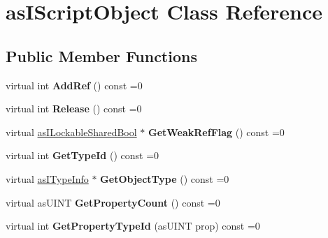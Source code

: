 \hypertarget{classas_i_script_object}{}\section{as\+I\+Script\+Object Class Reference}
\label{classas_i_script_object}
\subsection*{Public Member Functions}
\begin{DoxyCompactItemize}
\item 
\mbox{\label{classas_i_script_object_a3e08890e31163e4d33c0f27dc9072662}} 
virtual int {\bfseries Add\+Ref} () const =0
\item 
\mbox{\label{classas_i_script_object_a4bed3c3ac9f16294985835747aa122d3}} 
virtual int {\bfseries Release} () const =0
\item 
\mbox{\label{classas_i_script_object_a9ccca7fe3453219377fc9bd190bf7903}} 
virtual \hyperlink{classas_i_lockable_shared_bool}{as\+I\+Lockable\+Shared\+Bool} $\ast$ {\bfseries Get\+Weak\+Ref\+Flag} () const =0
\item 
\mbox{\label{classas_i_script_object_a19c5ab9d8adb0f921bf0b6474d97f468}} 
virtual int {\bfseries Get\+Type\+Id} () const =0
\item 
\mbox{\label{classas_i_script_object_aec79a2608f633a63169365d1ba79f611}} 
virtual \hyperlink{classas_i_type_info}{as\+I\+Type\+Info} $\ast$ {\bfseries Get\+Object\+Type} () const =0
\item 
\mbox{\label{classas_i_script_object_a902a8e3f3b4d6d2e56b6e258febf6259}} 
virtual as\+U\+I\+NT {\bfseries Get\+Property\+Count} () const =0
\item 
\mbox{\label{classas_i_script_object_a0b39e0e07b126b43d12ad1ec944a333e}} 
virtual int {\bfseries Get\+Property\+Type\+Id} (as\+U\+I\+NT prop) const =0
\item 
\mbox{\label{classas_i_script_object_af777076ab0d87e4995e1a343511f8a61}} 

\end{DoxyCompactItemize}
